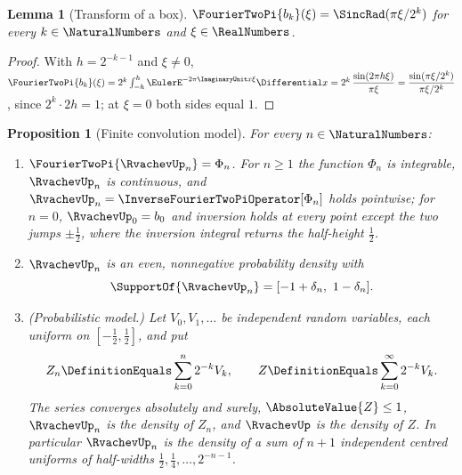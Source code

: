 \documentclass[11pt,oneside]{article}
\theoremstyle{plain}
\newtheorem{proposition}[theorem]{Proposition}
\newtheorem{lemma}[theorem]{Lemma}
\theoremstyle{definition}
\theoremstyle{remark}
\newcommand{\upn}[1]{\RvachevUp_{#1}}
\newcommand{\Phin}[1]{\Phi_{#1}}                            %
\begin{document}
\begin{lemma}[Transform of a box]
\label{due:lem:set-box-transform}
$\FourierTwoPi{b_k}(\xi)=\SincRad(\pi\xi/2^{k})$ for every
$k\in\NaturalNumbers$ and $\xi\in\RealNumbers$.
\end{lemma}

\begin{proof}
With $h=2^{-k-1}$ and $\xi\ne0$,
$\FourierTwoPi{b_k}(\xi)=2^{k}\int_{-h}^{h}\EulerE^{-2\pi\ImaginaryUnit x\xi}
\Differential x=2^{k}\,\dfrac{\sin(2\pi h\xi)}{\pi\xi}
=\dfrac{\sin(\pi\xi/2^{k})}{\pi\xi/2^{k}}$, since $2^{k}\cdot2h=1$; at
$\xi=0$ both sides equal $1$.
\end{proof}

\begin{proposition}[Finite convolution model]
\label{due:prop:set-convolution-model}
For every $n\in\NaturalNumbers$:
\begin{enumerate}
\item $\FourierTwoPi{\upn{n}}=\Phin{n}$.  For $n\ge1$ the function
      $\Phin{n}$ is integrable, $\upn{n}$ is continuous, and
      $\upn{n}=\InverseFourierTwoPiOperator[\Phin{n}]$ holds pointwise;
      for $n=0$, $\upn{0}=b_0$ and inversion holds at every point except
      the two jumps $\pm\frac12$, where the inversion integral returns the
      half-height $\frac12$.
\item $\upn{n}$ is an even, nonnegative probability density with
      \begin{equation}
       \SupportOf{\upn{n}}=[-1+\delta_n,\ 1-\delta_n].
       \label{due:eq:set-finite-support}
      \end{equation}
\item (Probabilistic model.)  Let $V_0,V_1,\ldots$ be independent random
      variables, each uniform on $[-\frac12,\frac12]$, and put
      \begin{equation}
       Z_n\DefinitionEquals\sum_{k=0}^{n}2^{-k}V_k,
       \qquad
       Z\DefinitionEquals\sum_{k=0}^{\infty}2^{-k}V_k .
       \label{due:eq:set-random-sums}
      \end{equation}
      The series converges absolutely and surely, $\AbsoluteValue{Z}\le1$,
      $\upn{n}$ is the density of $Z_n$, and $\RvachevUp$ is the density of
      $Z$.  In particular $\upn{n}$ is the density of a sum of $n+1$
      independent centred uniforms of half-widths
      $\frac12,\frac14,\ldots,2^{-n-1}$.
\end{enumerate}
\end{proposition}
\end{document}
